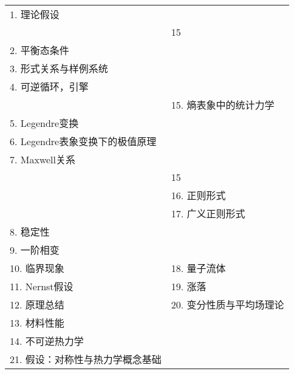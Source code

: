 \newpage
{{

\centering
\begin{tabular}{ll}
1. 理论假设 & \\
 & 15 \\
2. 平衡态条件 & \\
3. 形式关系与样例系统 & \\
4. 可逆循环，引擎 & \\
 & 15. 熵表象中的统计力学 \\
5. Legendre变换 & \\
6. Legendre表象变换下的极值原理 & \\
7. Maxwell关系 & \\
 & 15 \\
 & 16. 正则形式 \\
 & 17. 广义正则形式 \\
8. 稳定性 & \\
9. 一阶相变 & \\
\hline
10. 临界现象 & 18. 量子流体 \\
11. Nernst假设 & 19. 涨落 \\
12. 原理总结 & 20. 变分性质与平均场理论 \\
13. 材料性能 & \\
14. 不可逆热力学 & \\
\hline
21. 假设：对称性与热力学概念基础
\end{tabular}
}}
